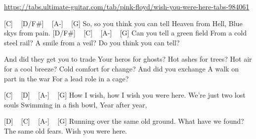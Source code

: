 
\url{https://tabs.ultimate-guitar.com/tab/pink-floyd/wish-you-were-here-tabs-984061}

[C] ~ [D/F#] ~ [A-] ~ [G] 
So, so you think you can tell
Heaven from Hell,
Blue skys from pain.
[D/F#] ~ [C] ~ [A-] ~ [G] 
Can you tell a green field
From a cold steel rail?
A smile from a veil?
Do you think you can tell?

And did they get you to trade
Your heros for ghosts?
Hot ashes for trees?
Hot air for a cool breeze?
Cold comfort for change?
And did you exchange
A walk on part in the war
For a lead role in a cage?

[C] ~ [D] ~ [A-] ~ [G]
How I wish, how I wish you were here.
We're just two lost souls
Swimming in a fish bowl,
Year after year,

[D] ~ [C] ~ [A-] ~ [G]
Running over the same old ground.
What have we found?
The same old fears.
Wish you were here. 